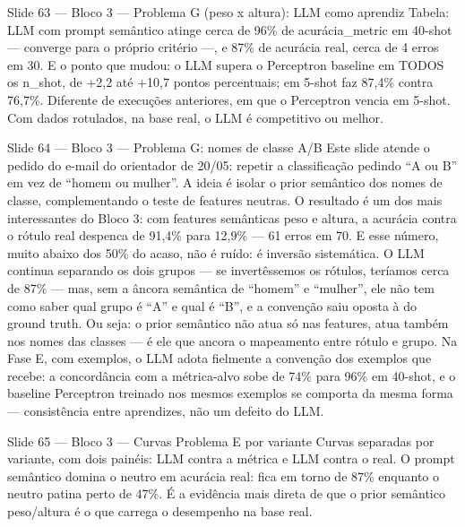 \documentclass[aspectratio=169,10pt]{beamer}
\begin{document}
\begin{frame}{Slide 63 --- Bloco 3 --- Problema G (peso x altura): LLM como aprendiz}
\footnotesize
Tabela: LLM com prompt sem\^antico atinge cerca de 96\% de acur\'acia\_metric em 40-shot --- converge para o pr\'oprio crit\'erio ---, e 87\% de acur\'acia real, cerca de 4 erros em 30. E o ponto que mudou: o LLM supera o Perceptron baseline em TODOS os n\_shot, de +2,2 at\'e +10,7 pontos percentuais; em 5-shot faz 87,4\% contra 76,7\%. Diferente de execu\c{c}\~oes anteriores, em que o Perceptron vencia em 5-shot. Com dados rotulados, na base real, o LLM \'e competitivo ou melhor.
\end{frame}

\begin{frame}{Slide 64 --- Bloco 3 --- Problema G: nomes de classe A/B}
\footnotesize
Este slide atende o pedido do e-mail do orientador de 20/05: repetir a classifica\c{c}\~ao pedindo ``A ou B'' em vez de ``homem ou mulher''. A ideia \'e isolar o prior sem\^antico dos nomes de classe, complementando o teste de features neutras. O resultado \'e um dos mais interessantes do Bloco 3: com features sem\^anticas peso e altura, a acur\'acia contra o r\'otulo real despenca de 91,4\% para 12,9\% --- 61 erros em 70. E esse n\'umero, muito abaixo dos 50\% do acaso, n\~ao \'e ru\'ido: \'e invers\~ao sistem\'atica. O LLM continua separando os dois grupos --- se invert\^essemos os r\'otulos, ter\'iamos cerca de 87\% --- mas, sem a \^ancora sem\^antica de ``homem'' e ``mulher'', ele n\~ao tem como saber qual grupo \'e ``A'' e qual \'e ``B'', e a conven\c{c}\~ao saiu oposta \`a do ground truth. Ou seja: o prior sem\^antico n\~ao atua s\'o nas features, atua tamb\'em nos nomes das classes --- \'e ele que ancora o mapeamento entre r\'otulo e grupo. Na Fase E, com exemplos, o LLM adota fielmente a conven\c{c}\~ao dos exemplos que recebe: a concord\^ancia com a m\'etrica-alvo sobe de 74\% para 96\% em 40-shot, e o baseline Perceptron treinado nos mesmos exemplos se comporta da mesma forma --- consist\^encia entre aprendizes, n\~ao um defeito do LLM.
\end{frame}

\begin{frame}{Slide 65 --- Bloco 3 --- Curvas Problema E por variante}
\footnotesize
Curvas separadas por variante, com dois pain\'eis: LLM contra a m\'etrica e LLM contra o real. O prompt sem\^antico domina o neutro em acur\'acia real: fica em torno de 87\% enquanto o neutro patina perto de 47\%. \'E a evid\^encia mais direta de que o prior sem\^antico peso/altura \'e o que carrega o desempenho na base real.
\end{frame}
\end{document}

